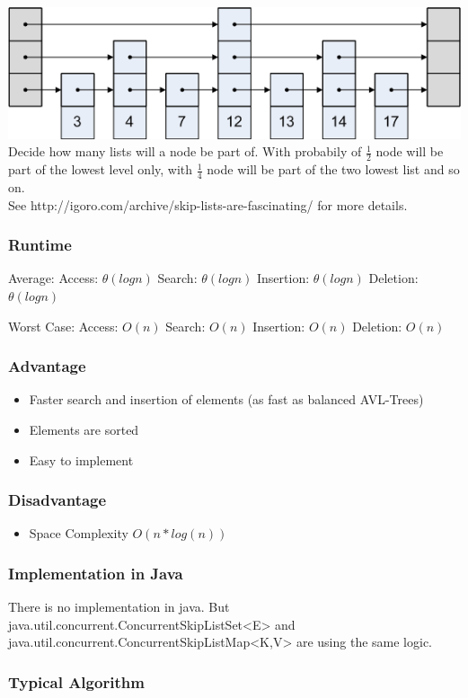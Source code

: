 \documentclass[12pt,a4paper]{article}
\newcommand{\RuntimeHead}{Runtime}
\newcommand{\AdvantageHead}{Advantage}
\newcommand{\DisadvantageHead}{Disadvantage}
\newcommand{\ImplementationInJavaHead}{Implementation in Java}
\newcommand{\TypicalAlgorithmHead}{Typical Algorithm}
\begin{document}
\includegraphics[]{SkipList}
Decide how many lists will a node be part of. With probabily of $\frac{1}{2}$ node will be part of the lowest level only, with $\frac{1}{4}$ node will be part of the two lowest list and so on.\\
See http://igoro.com/archive/skip-lists-are-fascinating/ for more details.


\subsubsection{\RuntimeHead}
Average: 
Access: $\theta(log n)  $
Search: $\theta(log n) $
Insertion: $ \theta(log n)$ 
Deletion: $\theta (log n)$ 

Worst Case: 
Access: $O( n)$  
Search: $O( n) $
Insertion: $O(n)$ 
Deletion: $O( n)$ 
\newline
\subsubsection{\AdvantageHead}
\begin{itemize}
\item Faster search and insertion of elements (as fast as balanced AVL-Trees)
\item Elements are sorted
\item Easy to implement
\end{itemize}
\subsubsection{\DisadvantageHead}
\begin{itemize}
\item Space Complexity $O(n*log(n))$
\end{itemize}
\subsubsection{\ImplementationInJavaHead}
There is no implementation in java. But java.util.concurrent.ConcurrentSkipListSet<E> and java.util.concurrent.ConcurrentSkipListMap<K,V> are using the same logic.
\subsubsection{\TypicalAlgorithmHead}
\end{document}
